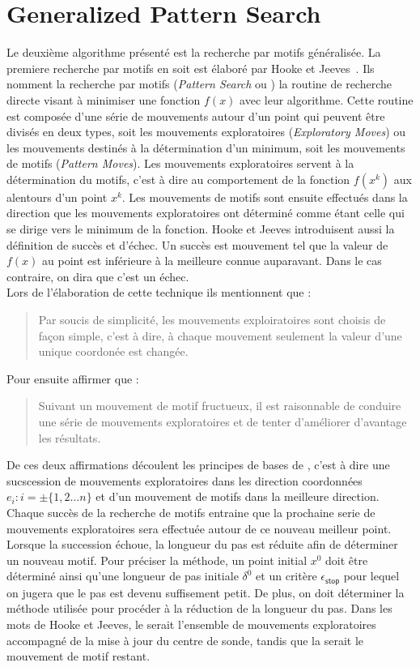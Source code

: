 \section{Generalized Pattern Search}
Le deuxième algorithme présenté est la recherche par motifs généralisée. La premiere recherche par motifs en soit est élaboré par Hooke et Jeeves~\cite{HoJe61a}. Ils nomment la recherche par motifs (\emph{Pattern Search} ou \PS) la routine de recherche directe visant à minimiser une fonction $f(x)$ avec leur algorithme. Cette routine est composée d'une série de mouvements autour d'un point qui peuvent être divisés en deux types, soit les mouvements exploratoires (\emph{Exploratory Moves}) ou les mouvements destinés à la détermination d'un minimum, soit les mouvements de motifs (\emph{Pattern Moves}). Les mouvements exploratoires  servent à la détermination du motifs, c'est à dire au comportement de la fonction $f(x^k)$ aux alentours d'un point $x^k$. Les mouvements de motifs sont ensuite effectués dans la direction que les mouvements exploratoires ont déterminé comme étant celle qui se dirige vers le minimum de la fonction. Hooke et Jeeves introduisent aussi la définition de succès et d'échec. Un succès est mouvement tel que la valeur de $f(x)$ au point est inférieure à la meilleure connue auparavant. Dans le cas contraire, on dira que c'est un échec.\\
Lors de l'élaboration de cette technique ils mentionnent que :
\begin{quote}
	Par soucis de simplicité, les mouvements exploiratoires sont choisis de façon simple, c'est à dire, à chaque mouvement seulement la valeur d'une unique coordonée est changée.
\end{quote}
Pour ensuite affirmer que : 
\begin{quote}
	Suivant un mouvement de motif fructueux, il est raisonnable de conduire une série de mouvements exploratoires et de tenter d'améliorer d'avantage les résultats.
\end{quote}
De ces deux affirmations découlent les principes de bases de \PS{}, c'est à dire une sucscession de mouvements exploratoires dans les direction coordonnées $e_i : i =\pm \{1,2\dots n\}$ et d'un mouvement de motifs dans la meilleure direction. Chaque succès de la recherche de motifs entraine que la prochaine serie de mouvements exploratoires sera effectuée autour de ce nouveau meilleur point. Lorsque la succession échoue, la longueur du pas est réduite afin de déterminer un nouveau motif. Pour préciser la méthode, un point initial $x^0$ doit être déterminé ainsi qu'une longueur de pas initiale $\delta^0$ et un critère $\epsilon_{\textsf{stop}}$ pour lequel on jugera que le pas est devenu suffisement petit. De plus, on doit déterminer la méthode utilisée pour procéder à la réduction de la longueur du pas. Dans les mots de Hooke et Jeeves, le \POLL{} serait l'ensemble de mouvements exploratoires accompagné de la mise à jour du centre de sonde, tandis que la \SEARCH{} serait le mouvement de motif restant.\\
